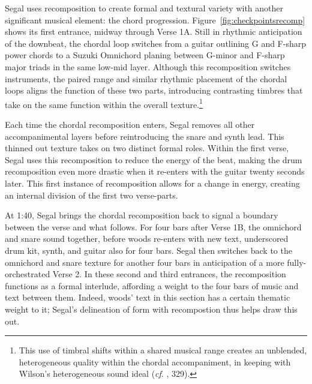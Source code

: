 Segal uses recomposition to create formal and textural variety with another significant musical element: the chord progression. Figure~\ref{fig:checkpointsrecomp} shows its first entrance, midway through Verse 1A. Still in rhythmic anticipation of the downbeat, the chordal loop switches from a guitar outlining G and F-sharp power chords to a Suzuki Omnichord planing between G-minor and F-sharp major triads in the same low-mid layer. Although this recomposition switches instruments, the paired range and similar rhythmic placement of the chordal loops aligns the function of these two parts, introducing contrasting timbres that take on the same function within the overall texture.\footnote{This use of timbral shifts within a shared musical range creates an unblended, heterogeneous quality within the chordal accompaniment, in keeping with Wilson's heterogeneous sound ideal (\textit{cf}.  \cite{ollywilsonHeterogeneousSoundIdeal1992}, 329).}

Each time the chordal recomposition enters, Segal removes all other accompanimental layers before reintroducing the snare and synth lead. This thinned out texture takes on two distinct formal roles. Within the first verse, Segal uses this recomposition to reduce the energy of the beat, making the drum recomposition even more drastic when it re-enters with the guitar twenty seconds later. This first instance of recomposition allows for a change in energy, creating an internal division of the first two verse-parts.

At 1:40, Segal brings the chordal recomposition back to signal a boundary between the verse and what follows. For four bars after Verse 1B, the omnichord and snare sound together, before woods re-enters with new text, underscored drum kit, synth, and guitar also for four bars. Segal then switches back to the omnichord and snare texture for another four bars in anticipation of a more fully-orchestrated Verse 2. In these second and third entrances, the recomposition functions as a formal interlude, affording a weight to the four bars of music and text between them. Indeed, woods' text in this section has a certain thematic weight to it; Segal's delineation of form with recompostion thus helps draw this out.

